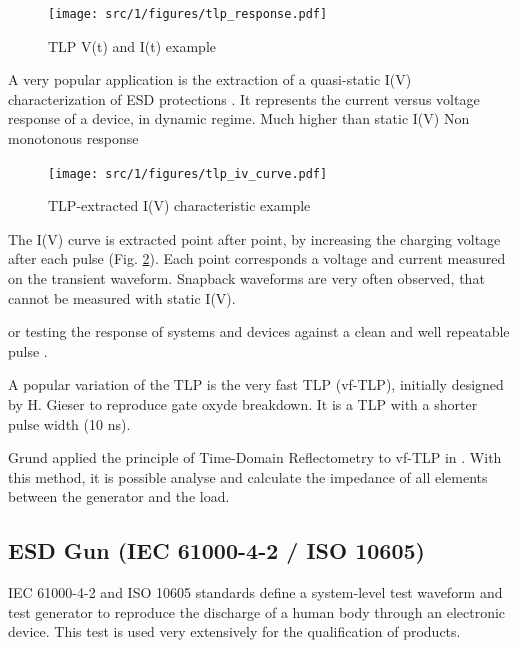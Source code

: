 \begin{figure}[!h]
  \centering
  \texttt{[image: src/1/figures/tlp\_response.pdf]}
  \caption{TLP V(t) and I(t) example}
  \label{fig:typical-tlp-response}
\end{figure}

A very popular application is the extraction of a quasi-static I(V) characterization of ESD protections \cite{TLPforESDProtectionCz}.
It represents the current versus voltage response of a device, in dynamic regime.
Much higher than static I(V)
Non monotonous response

\begin{figure}[!h]
  \centering
  \texttt{[image: src/1/figures/tlp\_iv\_curve.pdf]}
  \caption{TLP-extracted I(V) characteristic example}
  \label{fig:iv-curve-extraction}
\end{figure}

The I(V) curve is extracted point after point, by increasing the charging voltage after each pulse (Fig. \ref{fig:iv-curve-extraction}).
Each point corresponds a voltage and current measured on the transient waveform.
Snapback waveforms are very often observed, that cannot be measured with static I(V).

or testing the response of systems and devices against a clean and well repeatable pulse \cite{TLPthroubleshooting, LacrampeTransientImmunity}.

A popular variation of the TLP is the very fast TLP (vf-TLP), initially designed by H. Gieser \cite{vf-tlp} to reproduce gate oxyde breakdown.
It is a TLP with a shorter pulse width (10 ns).

Grund applied the principle of Time-Domain Reflectometry to vf-TLP in \cite{vf-tlp-tdr}.
With this method, it is possible analyse and calculate the impedance of all elements between the generator and the load.


\subsection{ESD Gun (IEC 61000-4-2 / ISO 10605)}

IEC 61000-4-2\cite{iec61000-4-2} and ISO 10605\cite{iso10605} standards define a system-level test waveform and test generator to reproduce the discharge of a human body through an electronic device.
This test is used very extensively for the qualification of products.

